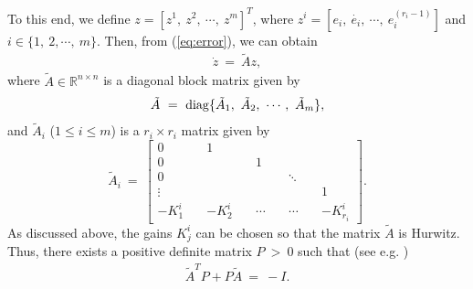 \documentclass[twoside,leqno,onecolumn]{article}
\begin{document}
To this end, we define $z=[z^1,~z^2,~\cdots,~z^m]^T$, where
$z^i=[e_i,~\dot{e_i},~\cdots,~e_i^{(r_i-1)}]$ and
$i\in\{1,~2,\cdots,~m\}$. Then, from (\ref{eq:error}), we can
obtain
\begin{align*}
\dot{z}~=~ \tilde{A} z,
\end{align*}where $\tilde{A}\in \mathbb{R}^{n\times n}$ is a diagonal block
matrix given by
\begin{align}
\label{eq:tildA}
\tilde{A}~=~{\rm{diag}}\{\tilde A_1,~\tilde A_2,~\cdots,~\tilde
A_m\},
\end{align}
and $\tilde A_i$ ($1\leq i\leq m$) is a $r_i\times r_i$ matrix
given by
\[ \tilde{A}_i~=~\left[ \begin{array}{cccccc}
0& 1&  \\
0& &1&\\
0&&&\ddots\\
\vdots&&&&1\\
-K^i_1\quad&-K^i_2\quad&\cdots\quad&\cdots\quad&-K^i_{r_i}
\end{array} \right].\]
As discussed above, the gains $K_j^i$ can be chosen so that the
matrix $\tilde{A}$ is Hurwitz. Thus, there exists a positive
definite matrix $P~>~ 0$ such that (see e.g. \cite{Khalil02})
\begin{align}
\label{eq:lyap} \tilde A^T P + P \tilde A ~=~-I.
\end{align} 
\end{document}
